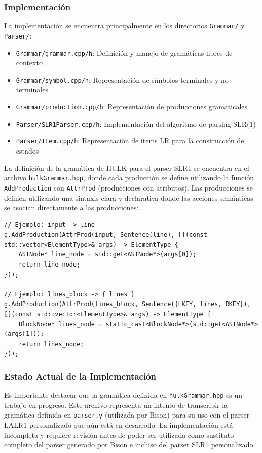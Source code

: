 \documentclass{article}
\begin{document}
\subsubsection{Implementación}
La implementación se encuentra principalmente en los directorios \texttt{Grammar/} y \texttt{Parser/}:
\begin{itemize}
    \item \texttt{Grammar/grammar.cpp/h}: Definición y manejo de gramáticas libres de contexto
    \item \texttt{Grammar/symbol.cpp/h}: Representación de símbolos terminales y no terminales
    \item \texttt{Grammar/production.cpp/h}: Representación de producciones gramaticales
    \item \texttt{Parser/SLR1Parser.cpp/h}: Implementación del algoritmo de parsing SLR(1)
    \item \texttt{Parser/Item.cpp/h}: Representación de ítems LR para la construcción de estados
\end{itemize}

La definición de la gramática de HULK para el parser SLR1 se encuentra en el archivo \texttt{hulkGrammar.hpp}, donde cada producción se define utilizando la función \texttt{AddProduction} con \texttt{AttrProd} (producciones con atributos). Las producciones se definen utilizando una sintaxis clara y declarativa donde las acciones semánticas se asocian directamente a las producciones:

\begin{verbatim}
// Ejemplo: input -> line
g.AddProduction(AttrProd(input, Sentence(line), [](const std::vector<ElementType>& args) -> ElementType {
    ASTNode* line_node = std::get<ASTNode*>(args[0]);
    return line_node;
}));

// Ejemplo: lines_block -> { lines }
g.AddProduction(AttrProd(lines_block, Sentence({LKEY, lines, RKEY}), [](const std::vector<ElementType>& args) -> ElementType {
    BlockNode* lines_node = static_cast<BlockNode*>(std::get<ASTNode*>(args[1]));
    return lines_node;
}));
\end{verbatim}

\subsubsection{Estado Actual de la Implementación}
Es importante destacar que la gramática definida en \texttt{hulkGrammar.hpp} es un trabajo en progreso. Este archivo representa un intento de transcribir la gramática definida en \texttt{parser.y} (utilizada por Bison) para su uso con el parser LALR1 personalizado que aún está en desarrollo. La implementación está incompleta y requiere revisión antes de poder ser utilizada como sustituto completo del parser generado por Bison e incluso del parser SLR1 personalizado.
\end{document}
